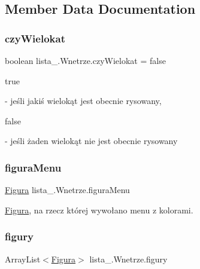 \subsection{Member Data Documentation}
\mbox{\label{classlista__5_1_1_wnetrze_aafcbd167c4a739f34f4c8420f41e7290}} 
\subsubsection{\texorpdfstring{czy\+Wielokat}{czyWielokat}}
{\footnotesize\ttfamily boolean lista\+\_.\+Wnetrze.\+czy\+Wielokat = false}


\begin{DoxyCode}
\textcolor{keyword}{true} 
\end{DoxyCode}
 -\/ jeśli jakiś wielokąt jest obecnie rysowany,
\begin{DoxyCode}
\textcolor{keyword}{false} 
\end{DoxyCode}
 -\/ jeśli żaden wielokąt nie jest obecnie rysowany \mbox{\label{classlista__5_1_1_wnetrze_a9ca273969f43e95e7cbb14771b661832}} 
\subsubsection{\texorpdfstring{figura\+Menu}{figuraMenu}}
{\footnotesize\ttfamily \mbox{\hyperlink{interfacelista__5_1_1_figura}{Figura}} lista\+\_.\+Wnetrze.\+figura\+Menu\hspace{0.3cm}{\ttfamily [private]}}

\mbox{\hyperlink{interfacelista__5_1_1_figura}{Figura}}, na rzecz której wywołano menu z kolorami. \mbox{\label{classlista__5_1_1_wnetrze_abeebc1924e88a0d99f63f06989b26de6}} 
\subsubsection{\texorpdfstring{figury}{figury}}
{\footnotesize\ttfamily Array\+List$<$\mbox{\hyperlink{interfacelista__5_1_1_figura}{Figura}}$>$ lista\+\_.\+Wnetrze.\+figury\hspace{0.3cm}{\ttfamily [private]}}

